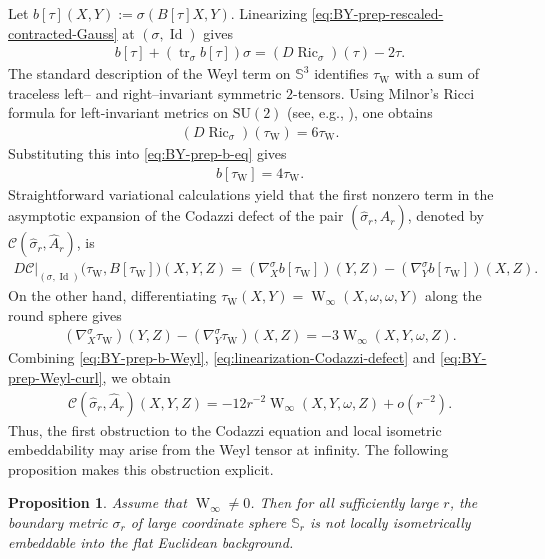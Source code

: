 \documentclass[10pt]{amsart}
\newcommand{\Sph}{\mathbb{S}}
\newcommand{\tr}{\operatorname{tr}}
\newcommand{\Ric}{\operatorname{Ric}}
\newcommand{\Weyl}{\operatorname{W}}
\newcommand{\Id}{\operatorname{Id}}
\newcommand{\SU}{\mathrm{SU}}
\theoremstyle{plain}
\newtheorem{proposition}[theorem]{Proposition}
\theoremstyle{remark}
\begin{document}
	Let $b[\tau](X,Y):=\sigma(B[\tau]X,Y)$. Linearizing \eqref{eq:BY-prep-rescaled-contracted-Gauss} at
	$(\sigma,\Id)$ gives
	\begin{align}\label{eq:BY-prep-b-eq}
		b[\tau]+(\tr_{\sigma}b[\tau])\sigma
		=
		(D\Ric_{\sigma})(\tau)-2\tau .
	\end{align}
	The standard description of the Weyl term on
	$\Sph^3$ identifies $\tau_{\Weyl}$ with a sum of traceless left-- and
	right--invariant symmetric $2$-tensors. Using Milnor's Ricci formula for
	left-invariant metrics on $\SU(2)$ (see, e.g., \cite{Milnor76}), one obtains
	\begin{align*}
		(D\Ric_{\sigma})(\tau_{\Weyl})
		=
		6\tau_{\Weyl}.
	\end{align*}
	Substituting this into \eqref{eq:BY-prep-b-eq} gives
	\begin{align}\label{eq:BY-prep-b-Weyl}
		b[\tau_{\Weyl}]
		=
		4\tau_{\Weyl}.
	\end{align}
	Straightforward variational calculations yield that the first nonzero term in the asymptotic expansion of the Codazzi defect of the pair
	$(\hat\sigma_r,\hat A_r)$, denoted by $\mathcal C(\hat\sigma_r,\hat A_r)$, is
	\begin{align}\label{eq:linearization-Codazzi-defect}
		D\mathcal C\big|_{(\sigma,\Id)}
		\bigl(\tau_{\Weyl},B[\tau_{\Weyl}]\bigr)(X,Y,Z)
		=
		(\nabla^{\sigma}_X b[\tau_{\Weyl}])(Y,Z)
		-
		(\nabla^{\sigma}_Y b[\tau_{\Weyl}])(X,Z).
	\end{align}
	On the other hand, differentiating
	$\tau_{\Weyl}(X,Y)=\Weyl_\infty(X,\omega,\omega,Y)$ along the round sphere gives
	\begin{align}\label{eq:BY-prep-Weyl-curl}
		(\nabla_X^{\sigma}\tau_{\Weyl})(Y,Z)
		-
		(\nabla_Y^{\sigma}\tau_{\Weyl})(X,Z)
		=
		-3\Weyl_\infty(X,Y,\omega,Z).
	\end{align}
	Combining \eqref{eq:BY-prep-b-Weyl}, \eqref{eq:linearization-Codazzi-defect} and \eqref{eq:BY-prep-Weyl-curl}, we obtain
	\begin{align}\label{eq:BY-prep-Weyl-Codazzi-defect}
		\mathcal C(\hat\sigma_r,\hat A_r)(X,Y,Z)
		=
		-12r^{-2}\Weyl_\infty(X,Y,\omega,Z)
		+
		o(r^{-2}).
	\end{align}
	Thus, the first obstruction to the Codazzi equation and local isometric embeddability may arise from the Weyl tensor at infinity. The following proposition makes this obstruction explicit.
	
	\begin{proposition}\label{prop:BY-Weyl-obstruction-LW}
		Assume that $\Weyl_\infty\neq 0$. Then for all sufficiently large $r$, the
		boundary metric $\sigma_r$ of large coordinate sphere $\Sph_r$ is not locally isometrically embeddable into the flat Euclidean background.
	\end{proposition}
	
\end{document}

